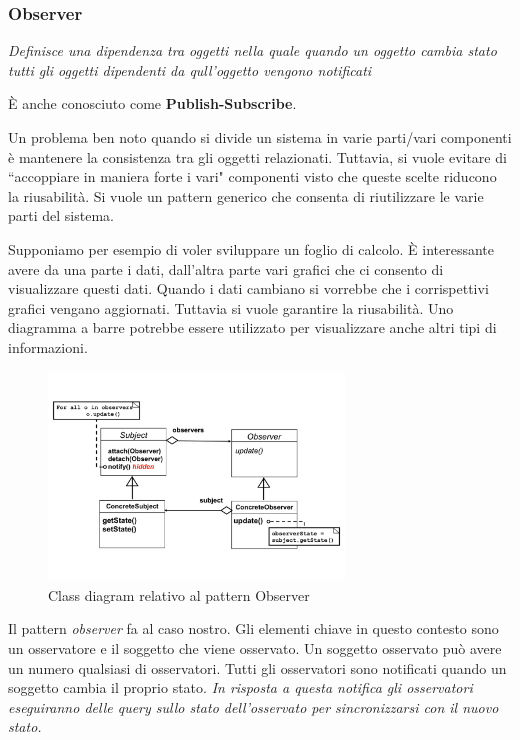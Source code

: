 \documentclass{article}
\begin{document}
\subsubsection{Observer}
\begin{framed}
\emph{Definisce una dipendenza tra oggetti nella quale quando un oggetto \emph{cambia stato} tutti gli oggetti dipendenti da qull'oggetto vengono notificati}
\end{framed}

\`E anche conosciuto come \textbf{Publish-Subscribe}.

Un problema ben noto quando si divide un sistema in varie parti/vari componenti \`e mantenere la consistenza tra gli oggetti relazionati. Tuttavia, si vuole evitare di ``accoppiare in maniera forte i vari" componenti visto che queste scelte riducono la riusabilit\`a. Si vuole un pattern generico che consenta di riutilizzare le varie parti del sistema.

Supponiamo per esempio di voler sviluppare un foglio di calcolo. \`E interessante avere da una parte i dati, dall'altra parte vari grafici che ci consento di visualizzare questi dati. Quando i dati cambiano si vorrebbe che i corrispettivi grafici vengano aggiornati. Tuttavia si vuole garantire la riusabilit\`a. Uno diagramma a barre potrebbe essere utilizzato per visualizzare anche altri tipi di informazioni.

\begin{figure}[h]
\centering
\includegraphics[width=0.7\textwidth]{Img/Observer.pdf}
\caption{Class diagram relativo al pattern Observer}
\label{Fig:ObserverConcepts}
\end{figure}

Il pattern \emph{observer} fa al caso nostro. Gli elementi chiave in questo contesto sono un osservatore e il soggetto che viene osservato. Un soggetto osservato pu\`o avere un numero qualsiasi di osservatori.  Tutti gli osservatori sono notificati quando un soggetto cambia il proprio stato. \emph{In risposta a questa notifica gli osservatori eseguiranno delle query sullo stato dell'osservato per sincronizzarsi con il nuovo stato.}
\end{document}
